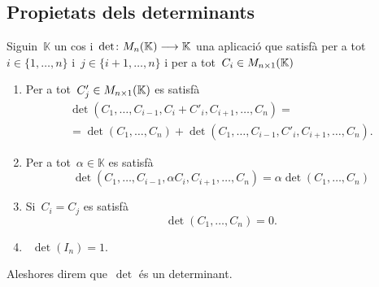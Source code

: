 \documentclass[../../main.tex]{subfiles}
\begin{document}
	\subsection{Propietats dels determinants}
	\begin{definition}[Determinant]
		\label{def:determinant d'una matriu}
		Siguin~\(\mathbb{K}\) un cos i~\(\det\colon M_{n}(\mathbb{K})\longrightarrow\mathbb{K}\) una aplicació que satisfà per a tot~\(i\in\{1,\dots,n\}\) i~\(j\in\{i+1,\dots,n\}\) i per a tot~\(C_{i}\in M_{n\times1}(\mathbb{K})\)
		\begin{enumerate}
			\item Per a tot~\(C'_{j}\in M_{n\times1}(\mathbb{K})\) es satisfà
			\begin{multline*}
			\det(C_{1},\dots,C_{i-1},C_{i}+C'_{i},C_{i+1},\dots,C_{n})=\\
			=\det(C_{1},\dots,C_{n})+\det(C_{1},\dots,C_{i-1},C'_{i},C_{i+1},\dots,C_{n}).
			\end{multline*}
			\item Per a tot~\(\alpha\in\mathbb{K}\) es satisfà
			\[
			    \det(C_{1},\dots,C_{i-1},\alpha C_{i},C_{i+1},\dots,C_{n})=\alpha\det(C_{1},\dots,C_{n})
			\]
			\item Si~\(C_{i}=C_{j}\) es satisfà
			\[
			    \det(C_{1},\dots,C_{n})=0.
			\]
			\item~\(\det(I_{n})=1\).
		\end{enumerate}
		Aleshores direm que~\(\det\) és un determinant.
	\end{definition}
	\begin{proposition}

	\end{proposition}
%
%
\end{document}
